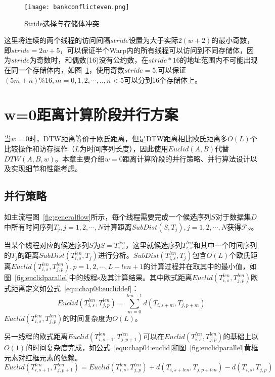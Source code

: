 \begin{figure}[H] %
	\centering
	\texttt{[image: bankconflicteven.png]}
	\caption{Stride选择与存储体冲突}
	\label{fig:BankConflictEven}
\end{figure}

这里将连续的两个线程的访问间隔$stride$设置为大于实际$2(w+2)$的最小奇数，即$stride=2w+5$，可以保证半个Warp内的所有线程可以访问到不同存储体，因为$stride$为奇数时，和偶数(16)没有公约数，在$stride*16$的地址范围内不可能出现在同一个存储体内，如图~\ref{fig:BankConflictEven}，使用奇数$stride=5$,可以保证$(5m+n)\%16,m=0,1,2,\cdots,..,n < 5$可以分到16个存储体上。


\section{w=0距离计算阶段并行方案}
\label{cha:chap04:myalg:euclid}

当$w=0$时，DTW距离等价于欧氏距离，但是DTW距离相比欧氏距离多$O(L)$个比较操作和访存操作（$L$为时间序列长度），因此使用$Euclid(A,B)$代替$DTW(A,B,w)$。本章主要介绍$w=0$距离计算阶段的并行策略、并行算法设计以及实现细节和性能考虑。

\subsection{并行策略}
\label{cha:chap04:myalg:euclid:Strategies}

如主流程图~\ref{fig:generalflow}所示，每个线程需要完成一个候选序列$S$对于数据集$D$中所有时间序列$T_j,j=1,2,\cdots,N$计算距离$SubDist(S,T_j),j=1,2,\cdots,N$获得$\mathcal{F}_S$。

当某个线程对应的候选序列$S$为$S=T_{i,s}^{len}$，这里就候选序列$T_{i,s}^{len}$和其中一个时间序列的$T_j$的距离$SubDist(T_{i,s}^{len},T_j)$进行分析。$SubDist(T_{i,s}^{len},T_j)$包含$O(L)$个欧氏距离$Euclid(T_{i,s}^{len},T_{j,p}^{len}),p=1,2,\cdots,L-len+1$的计算过程并在取其中的最小值，如图~\ref{fig:euclidparallel}中的线程s及其计算结果。其中欧式距离$Euclid(T_{i,s}^{len},T_{j,p}^{len})$欧式距离定义如公式~\ref{equ:chap04:eucliddef}：
\begin{equation}
\label{equ:chap04:eucliddef}
Euclid(T_{i,s}^{len},T_{j,p}^{len}) = \sum_{m=0}^{len-1}d(T_{i,s+m},T_{j,p+m})
\end{equation}
$Euclid(T_{i,s}^{len},T_{j,p}^{len})$的时间复杂度为$O(L)$。

另一线程的欧式距离$Euclid(T_{i,s+1}^{len},T_{j,p+1}^{len})$可以在$Euclid(T_{i,s}^{len},T_{j,p}^{len})$的基础上以$O(1)$的时间复杂度完成，如公式~\ref{equ:chap04:euclid}和图~\ref{fig:euclidparallel}黄框元素对红框元素的依赖。
\begin{equation}
\label{equ:chap04:euclid}
Euclid(T_{i,s+1}^{len},T_{j,p+1}^{len}) = Euclid(T_{i,s}^{len},T_{j,p}^{len}) + d(T_{i,s+len},T_{j,p+len}) - d(T_{i,s},T_{j,p})
\end{equation}

